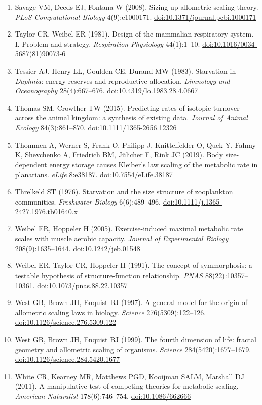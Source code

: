 \begin{small}
\begin{enumerate}[label={},leftmargin=1.2em,itemindent=-1.2em,itemsep=0.15em]
\item Savage VM, Deeds EJ, Fontana W (2008). Sizing up allometric scaling theory. \emph{PLoS Computational Biology} 4(9):e1000171. \href{https://doi.org/10.1371/journal.pcbi.1000171}{doi:10.1371/journal.pcbi.1000171}
\item Taylor CR, Weibel ER (1981). Design of the mammalian respiratory system. I. Problem and strategy. \emph{Respiration Physiology} 44(1):1–10. \href{https://doi.org/10.1016/0034-5687(81)90073-6}{doi:10.1016/0034-5687(81)90073-6}
\item Tessier AJ, Henry LL, Goulden CE, Durand MW (1983). Starvation in \emph{Daphnia}: energy reserves and reproductive allocation. \emph{Limnology and Oceanography} 28(4):667–676. \href{https://doi.org/10.4319/lo.1983.28.4.0667}{doi:10.4319/lo.1983.28.4.0667}
\item Thomas SM, Crowther TW (2015). Predicting rates of isotopic turnover across the animal kingdom: a synthesis of existing data. \emph{Journal of Animal Ecology} 84(3):861–870. \href{https://doi.org/10.1111/1365-2656.12326}{doi:10.1111/1365-2656.12326}
\item Thommen A, Werner S, Frank O, Philipp J, Knittelfelder O, Quek Y, Fahmy K, Shevchenko A, Friedrich BM, Jülicher F, Rink JC (2019). Body size-dependent energy storage causes Kleiber's law scaling of the metabolic rate in planarians. \emph{eLife} 8:e38187. \href{https://doi.org/10.7554/eLife.38187}{doi:10.7554/eLife.38187}
\item Threlkeld ST (1976). Starvation and the size structure of zooplankton communities. \emph{Freshwater Biology} 6(6):489–496. \href{https://doi.org/10.1111/j.1365-2427.1976.tb01640.x}{doi:10.1111/j.1365-2427.1976.tb01640.x}
\item Weibel ER, Hoppeler H (2005). Exercise-induced maximal metabolic rate scales with muscle aerobic capacity. \emph{Journal of Experimental Biology} 208(9):1635–1644. \href{https://doi.org/10.1242/jeb.01548}{doi:10.1242/jeb.01548}
\item Weibel ER, Taylor CR, Hoppeler H (1991). The concept of symmorphosis: a testable hypothesis of structure-function relationship. \emph{PNAS} 88(22):10357–10361. \href{https://doi.org/10.1073/pnas.88.22.10357}{doi:10.1073/pnas.88.22.10357}
\item West GB, Brown JH, Enquist BJ (1997). A general model for the origin of allometric scaling laws in biology. \emph{Science} 276(5309):122–126. \href{https://doi.org/10.1126/science.276.5309.122}{doi:10.1126/science.276.5309.122}
\item West GB, Brown JH, Enquist BJ (1999). The fourth dimension of life: fractal geometry and allometric scaling of organisms. \emph{Science} 284(5420):1677–1679. \href{https://doi.org/10.1126/science.284.5420.1677}{doi:10.1126/science.284.5420.1677}
\item White CR, Kearney MR, Matthews PGD, Kooijman SALM, Marshall DJ (2011). A manipulative test of competing theories for metabolic scaling. \emph{American Naturalist} 178(6):746–754. \href{https://doi.org/10.1086/662666}{doi:10.1086/662666}
\end{enumerate}
\end{small}
